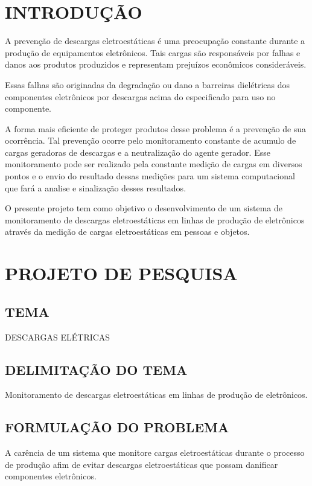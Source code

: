 \documentclass[
	12pt,				%
	openright,			%
	oneside,			%
	a4paper,			%
	chapter=TITLE,		%
	english,			%
	french,				%
	spanish,			%
	brazil,				%
	article,			%
	]{uea-abntex2}
\begin{document}
\chapter*{\vspace*{3.4cm}INTRODUÇÃO}
A prevenção de descargas eletroestáticas é uma preocupação constante durante a produção de equipamentos eletrônicos. Tais cargas são responsáveis por falhas e danos aos produtos produzidos e representam prejuízos econômicos consideráveis.

Essas falhas são originadas da degradação ou dano a barreiras dielétricas dos componentes eletrônicos por descargas acima do especificado para uso no componente.

A forma mais eficiente de proteger produtos desse problema é a prevenção de sua ocorrência. Tal prevenção ocorre pelo monitoramento constante de acumulo de cargas geradoras de descargas e a neutralização do agente gerador.
Esse monitoramento pode ser realizado pela constante medição de cargas em diversos pontos e o envio do resultado dessas medições para um sistema computacional que fará a analise e sinalização desses resultados. 

O presente projeto tem como objetivo o desenvolvimento de um sistema de monitoramento de descargas eletroestáticas em linhas de produção de eletrônicos através da medição de cargas eletroestáticas em pessoas e objetos.


\newpage
\chapter*{\vspace*{3.4cm}PROJETO DE PESQUISA}

\vspace{24pt}
\section{TEMA}
DESCARGAS ELÉTRICAS
\section{DELIMITAÇÃO DO TEMA}
Monitoramento de descargas eletroestáticas em linhas de produção de eletrônicos.
\section{FORMULAÇÃO DO PROBLEMA}
A carência de um sistema que monitore cargas eletroestáticas durante o processo de produção afim de evitar descargas eletroestáticas que possam danificar componentes eletrônicos.  
\end{document}
